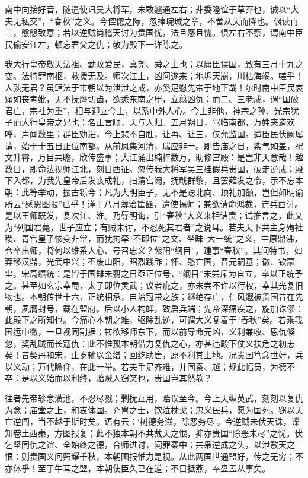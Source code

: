 \documentclass[]{article}
\begin{document}
南中向接好音，随遣使讯吴大将军，未敢遽通左右；非委隆谊于草莽也，诚以``大夫无私交''，``春秋''之义。今倥偬之际，忽捧琬瑊之章，不啻从天而降也。讽读再三，慇慇致意；若以逆贼尚稽天讨为贵国忧，法且感且愧。惧左右不察，谓南中臣民偷安江左，顿忘君父之仇；敬为殿下一详陈之。

我大行皇帝敬天法祖、勤政爱民，真尧、舜之主也；以庸臣误国，致有三月十九之变。法待罪南枢，救援无及。师次江上，凶问遂来；地坼天崩，川枯海竭。嗟乎！人孰无君？虽肆法于市朝以为泄泄之戒，亦奚足慰先帝于地下哉！尔时南中臣民哀痛如丧考妣，无不抚膺切齿，欲悉东南之甲，立翦凶仇；而二、三老成，谓``国破君亡，宗社为重''，相与迎立今上，以系中外人心。今上非他，神宗之孙、光宗犹子而大行皇帝之兄也；名正言顺，天与人归。五月朔日，驾临南都，万姓夹道欢呼，声闻数里；群臣劝进，今上悲不自胜，让再、让三，仅允监国。迨臣民伏阙屡请，始于十五日正位南都。从前凤集河清，瑞应非一。即告庙之日，紫气如盖，祝文升霄，万目共瞻，欣传盛事；大江涌出楠梓数万，助修宫殿：是岂非天意哉！越数日，即命法视师江北，刻日西征。忽传我大将军吴三桂假兵贵国，破走逆成；殿下入都，为我先皇帝后发丧成礼，扫清宫阙，抚戢群黎，且罢薙发之令，示不忘本朝：此等举动，振古铄今；凡为大明臣子，无不是跽北向、顶礼加额，岂但如明谕所云``感恩图报''已乎！谨于八月薄治筐篚，遣使犒师；兼欲请命鸿裁，连兵西讨。是以王师既发，复次江、淮。乃辱明诲，引``春秋''大义来相诘责；试推言之，此又为``列国君薨，世子应立；有贼未讨，不忍死其君者''之说耳。若夫天下共主身殉社稷、青宫皇子惨变非常，而犹拘牵``不即位''之文、坐昧``大一统''之义，中原鼎沸，仓卒出师，将何以维系人心、号召忠义？紫阳``纲目''，踵事``春秋''。其间特书，如莽移汉鼎，光武中兴；丕废山阳，昭烈践祚；怀、愍亡国，晋元嗣基；徽、钦蒙尘，宋高缵统：是皆于国雠未翦之日亟正位号，``纲目''未尝斥为自立，卒以正统予之。甚至如玄宗幸蜀，太子即位灵武；议者疵之，亦未尝不许以行权，幸其光复旧物也。本朝传世十六，正统相承，自治冠带之族；继绝存亡，仁风遐被贵国昔在先朝，夙膺封号，载在盟府。后以小人构衅，致启兵端；先帝深痛疾之，旋加诛僇：此殿下之所知也。今痛心本朝之难，驱除乱逆，可谓大义复着于``春秋''矣。若乘我国运中微，一旦视同割据；转欲移师东下，而以前导命元凶，义利兼收、恩仇倏忽，奖乱贼而长寇仇：此不惟孤本朝借力复仇之心，亦甚违殿下仗义扶危之初志矣！昔契丹和宋，止岁输以金缯；回纥助唐，原不利其土地。况贵国笃念世好，兵以义动；万代瞻仰，在此一举。若夫手足齐难，并同秦、越；规此幅员，为德不卒：是以义始而以利终，贻贼人窃笑也，贵国岂其然欤？

往者先帝轸念潢池，不忍尽戮；剿抚互用，贻误至今。今上天纵英武，刻刻以复仇为念；庙堂之上，和衷体国。介胄之士，饮泣枕戈；忠义民兵，愿为国死。窃以天亡逆闯，当不越于斯时矣。语有云：`树德务滋，除恶务尽'。今逆贼未伏天诛，谍知卷土西秦，方图报复；此不独本朝不共戴天之恨，抑亦贵国``除恶未尽''之忧。伏乞坚同仇之谊、全始终之德，合师进讨，问罪秦中；共枭逆成之头，以泄敷天之恨：则贵国义问照耀千秋，本朝图报惟力是视。从此两国世通盟好，传之无穷；不亦休乎！至于牛耳之盟，本朝使臣久已在道；不日抵燕，奉盘盂从事矣。
\end{document}
